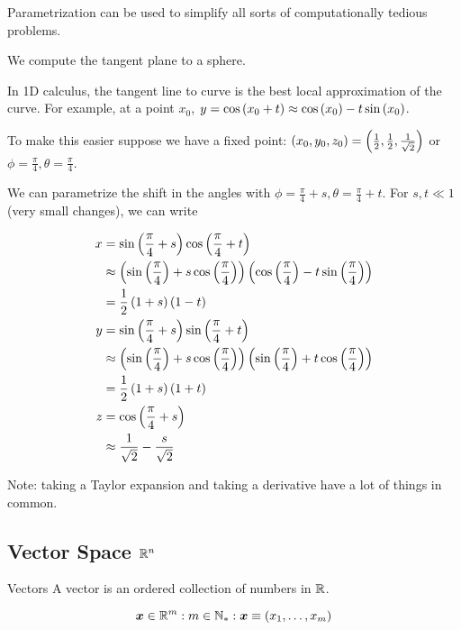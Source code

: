\documentclass[11pt]{article}
\begin{document}
Parametrization can be used to simplify all sorts of computationally tedious problems.

\begin{example}
  
  We compute the tangent plane to a sphere.

  In 1D calculus, the tangent line to curve is the best local approximation of the curve.
  For example, at a point $x_0$,  $y = \cos \left ( x_0 + t \right) \approx \cos \left ( x_0 \right) - t \sin \left ( x_0 \right)$.

  To make this easier suppose we have a fixed point: $\left ( x_0, y_0, z_0 \right) = \left ( \frac{1}{2}, \frac{1}{2}, \frac{1}{\sqrt{2}} \right)$ or $\phi = \frac{\pi}{4}, \theta = \frac{\pi}{4}$.

  We can parametrize the shift in the angles with $\phi = \frac{\pi}{4} + s, \theta = \frac{\pi}{4} + t$. For $s, t \ll 1$ (very small changes), we can write

  \begin{align*}
    x &= \sin \left (  \frac{\pi}{4} + s \right) \cos \left (  \frac{\pi}{4} + t \right) \\
      & \approx \left ( \sin \left ( \frac{\pi}{4} \right) + s \cos \left ( \frac{\pi}{4} \right) \right) \left ( \cos \left ( \frac{\pi}{4} \right) - t \sin \left ( \frac{\pi}{4} \right) \right) \\
      &= \frac{1}{2} \left ( 1+s \right) \left ( 1-t \right) \\
    y &= \sin \left ( \frac{\pi}{4} + s \right) \sin \left (  \frac{\pi}{4} + t \right) \\
      & \approx \left ( \sin \left ( \frac{\pi}{4} \right) + s \cos \left ( \frac{\pi}{4} \right) \right)  \left ( \sin \left ( \frac{\pi}{4} \right) + t \cos \left ( \frac{\pi}{4} \right) \right) \\
      &= \frac{1}{2} \left ( 1+s \right) \left ( 1+t \right) \\
    z &= \cos \left ( \frac{\pi}{4} + s \right) \\
      & \approx \frac{1}{\sqrt{2}} - \frac{s}{\sqrt{2}} \\
  \end{align*}

  Note: taking a Taylor expansion and taking a derivative have a lot of things in common.
\end{example}





\subsection{Vector Space $\mathbb R^n$}

\begin{definition}{Vectors}
  A vector is an ordered collection of numbers in $\mathbb R$.

  $$\bm{x} \in \mathbb R^m : m \in \mathbb N_* : \bm{x} \equiv (x_1, \dots, x_m)$$
\end{definition}
\end{document}
